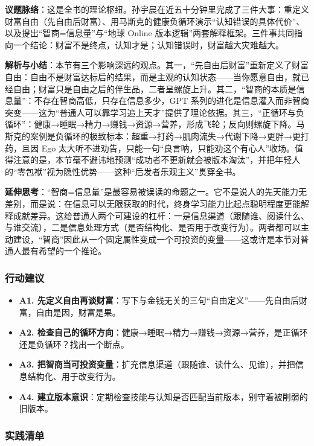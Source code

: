 \textbf{议题脉络}：这是全书的理论枢纽。孙宇晨在近五十分钟里完成了三件大事：重定义财富自由（先自由后财富）、用马斯克的健康负循环演示``认知错误的具体代价''、以及提出``智商=信息量''与``地球
Online
版本逻辑''两套解释框架。三件事共同指向一个结论：财富不是终点，认知才是；认知错误时，财富越大灾难越大。

\textbf{解析与小结}：本节有三个影响深远的观点。其一，``先自由后财富''重新定义了财富自由：自由不是财富达标后的结果，而是主观的认知状态------当你愿意自由，就已经自由；财富只是自由之后的伴生品，二者呈螺旋上升。其二，``智商的本质是信息量''：不存在智商高低，只存在信息多少，GPT
系列的进化是信息灌入而非智商突变------这为``普通人可以靠学习追上天才''提供了理论依据。其三，``正循环与负循环''：健康→睡眠→精力→赚钱→资源→营养，形成飞轮；反向则螺旋下降。马斯克的案例是负循环的极致标本：超重→打药→肌肉流失→代谢下降→更胖→更打药，且因
Ego
太大听不进劝告，只能一句``良言呐，只能劝这个有心人''收场。值得注意的是，本节毫不避讳地预测``成功者不更新就会被版本淘汰''，并把年轻人的``零包袱''视为隐性优势------这种``后发者乐观主义''贯穿全书。

\textbf{延伸思考}：``智商=信息量''是最容易被误读的命题之一。它不是说人的先天能力无差别，而是说：在信息可以无限获取的时代，终身学习能力比起点聪明程度更能解释成就差异。这给普通人两个可建设的杠杆：一是信息渠道（跟随谁、阅读什么、与谁交流），二是信息处理方式（是否结构化、是否用于改变行为）。两者都可以主动建设，``智商''因此从一个固定属性变成一个可投资的变量------这或许是本节对普通人最有希望的一个推论。

\subsubsection{行动建议}

\begin{itemize}
\tightlist
\item
  \textbf{A1.
  先定义自由再谈财富}：写下与金钱无关的三句``自由定义''------先自由后财富，自由是因，财富是果。
\item
  \textbf{A2.
  检查自己的循环方向}：健康→睡眠→精力→赚钱→资源→营养，是正循环还是负循环？找出一个断点。
\item
  \textbf{A3.
  把智商当可投资变量}：扩充信息渠道（跟随谁、读什么、见谁），并把信息结构化、用于改变行为。
\item
  \textbf{A4.
  建立版本意识}：定期检查技能与认知是否匹配当前版本，别守着被削弱的旧版本。
\end{itemize}

\subsubsection{实践清单}

